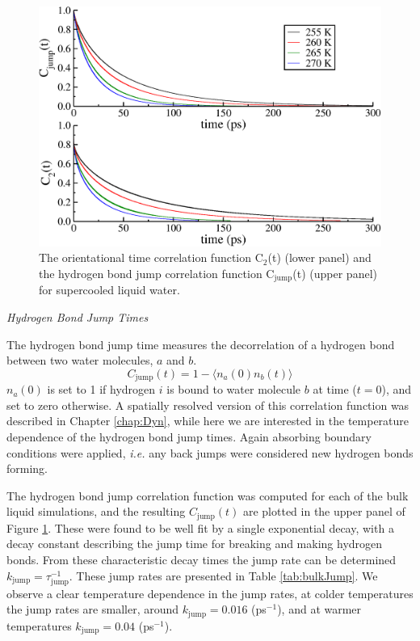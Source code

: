 \begin{figure}
\includegraphics[width=\linewidth]{Figures/jump_lcorr}
\caption{\label{fig:jump_lcorr} The orientational time correlation
  function C$_2$(t) (lower panel) and the hydrogen bond jump
  correlation function C$_\mathrm{jump}$(t) (upper panel) for
  supercooled liquid water. }
\end{figure}                


\begin{flushleft}
\textit{Hydrogen Bond Jump Times}
\end{flushleft}
The hydrogen bond jump time measures the decorrelation of a hydrogen
bond between two water molecules, $a$ and $b$. 
\begin{equation}\label{jump}
C_\mathrm{jump}(t) = 1 - \langle n_a(0) n_b(t) \rangle
\end{equation}
$n_a(0)$ is set to 1 if hydrogen $i$ is bound to water molecule $b$ at
time ($t=0$), and set to zero otherwise. A spatially resolved version
of this correlation function was described in Chapter \ref{chap:Dyn},
while here we are interested in the temperature dependence of the
hydrogen bond jump times. Again absorbing boundary conditions were
applied, \textit{i.e.} any back jumps were considered new hydrogen
bonds forming.

The hydrogen bond jump correlation function was computed for each of
the bulk liquid simulations, and the resulting $C_\mathrm{jump}(t)$
are plotted in the upper panel of Figure \ref{fig:jump_lcorr}. These
were found to be well fit by a single exponential decay, with a decay
constant describing the jump time for breaking and making hydrogen
bonds. From these characteristic decay times the jump rate can be
determined $k_\mathrm{jump} = \tau_\mathrm{jump}^{-1}$. These jump
rates are presented in Table \ref{tab:bulkJump}. We observe a clear
temperature dependence in the jump rates, at colder temperatures the
jump rates are smaller, around $k_\mathrm{jump} = 0.016$ (ps$^{-1}$),
and at warmer temperatures $k_\mathrm{jump} = 0.04$ (ps$^{-1}$).

